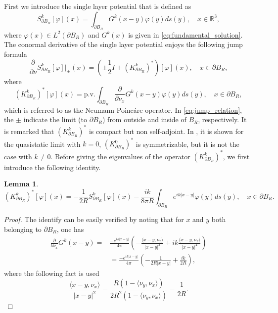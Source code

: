 \documentclass[11pt,reqno,twoside]{amsart}
\newtheorem{lem}{Lemma}[section]
\theoremstyle{definition}
\theoremstyle{remark}
\numberwithin{equation}{section}
\begin{document}
 First we introduce the single layer potential that is defined as
\[
 S_{\partial B_R}^{k}[\varphi](x)=\int_{\partial B_R}G^k(x-y)\varphi(y)ds(y), \quad x\in\mathbb{R}^3,
\]
where $\varphi(x)\in L^2(\partial B_R)$ and $G^k(x)$ is given in \eqref{eq:fundamental_solution}. The conormal derivative of the single layer potential enjoys the following jump formula
\begin{equation}\label{eq:jump_relation}
\frac{\partial}{\partial\nu}S_{\partial B_R}^{k}[\varphi]|_{\pm}(x)=\left(\pm\frac{1}{2}I + \left(K_{\partial B_R}^k\right)^* \right)[\varphi](x), \quad x\in\partial B_{R},
\end{equation}
where
\[
\left(K_{\partial B_R}^k\right)^*[\varphi](x)= \mbox{p.v.}\int_{\partial B_R} \frac{\partial}{\partial\nu_x}G^k(x-y)\varphi(y)ds(y), \quad x\in\partial B_{R},
\]
which is referred to as the Neumann-Poinc\'are operator. In \eqref{eq:jump_relation}, the $\pm$ indicate the limit (to $\partial B_R$) from outside and inside of $B_R$, respectively. It is remarked that $(K^k_{\partial B_R})^*$ is compact but non self-adjoint. In \cite{Ack13}, it is shown for the quasistatic limit with $k=0$, $(K^0_{\partial B_R})^*$ is symmetrizable, but it is not the case with $k\neq 0$. Before giving the eigenvalues of the operator $\left(K_{\partial B_R}^k\right)^*$, we first introduce the following identity.
\begin{lem}
\begin{equation}\label{eq:k_star_identity}
  \left(K_{\partial B_R}^k\right)^*[\varphi](x)=-\frac{1}{2R}S_{\partial B_R}^{k}[\varphi](x)- \frac{ik}{8\pi R}\int_{\partial B_R}e^{ik|x-y|}\varphi(y)ds(y),\quad x\in\partial B_R.
\end{equation}
\end{lem}
\begin{proof}
The identify can be easily verified by noting that for $x$ and $y$ both belonging to $\partial B_R$, one has
\[
\begin{split}
   \frac{\partial}{\partial\nu_x}G^k(x-y)= & \frac{-e^{ik|x-y|}}{4\pi}\left(-\frac{\langle x-y,\nu_x\rangle}{|x-y|^3} + ik\frac{\langle x-y,\nu_x\rangle}{|x-y|^2}  \right)\\
    & = \frac{-e^{ik|x-y|}}{4\pi}\left(-\frac{1}{2R|x-y|} + \frac{ik}{2R}  \right),
\end{split}
\]
where the following fact is used
\[
  \frac{\langle x-y,\nu_x\rangle}{|x-y|^2}=\frac{R(1-\langle \nu_y,\nu_x\rangle)}{2R^2(1-\langle \nu_y,\nu_x\rangle)}=\frac{1}{2R}.
\]
\end{proof}
\end{document}
